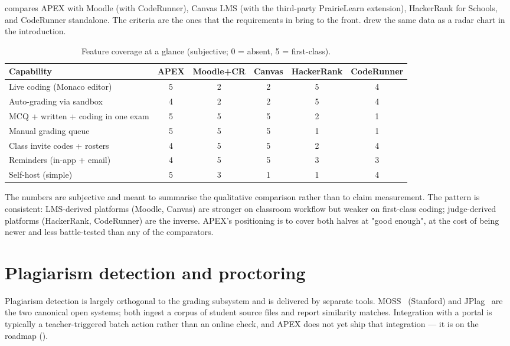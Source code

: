  compares APEX with Moodle (with CodeRunner), Canvas LMS (with the third-party PrairieLearn extension), HackerRank for Schools, and CodeRunner standalone. The criteria are the ones that the requirements in  bring to the front.  drew the same data as a radar chart in the introduction.

\begin{table}[H]
  \centering
  \caption{Feature coverage at a glance (subjective; 0 = absent, 5 = first-class).}
  \label{tab:peer-comparison}
  \small
  \begin{tabularx}{\linewidth}{X c c c c c}
    \toprule
    Capability & APEX & Moodle+CR & Canvas & HackerRank & CodeRunner \\
    \midrule
    Live coding (Monaco editor)               & 5 & 2 & 2 & 5 & 4 \\
    Auto-grading via sandbox                  & 4 & 2 & 2 & 5 & 4 \\
    MCQ + written + coding in one exam        & 5 & 5 & 5 & 2 & 1 \\
    Manual grading queue                       & 5 & 5 & 5 & 1 & 1 \\
    Class invite codes + rosters              & 4 & 5 & 5 & 2 & 4 \\
    Reminders (in-app + email)                 & 4 & 5 & 5 & 3 & 3 \\
    Self-host (simple)                         & 5 & 3 & 1 & 1 & 4 \\
    \bottomrule
  \end{tabularx}
\end{table}

The numbers are subjective and meant to summarise the qualitative comparison rather than to claim measurement. The pattern is consistent: LMS-derived platforms (Moodle, Canvas) are stronger on classroom workflow but weaker on first-class coding; judge-derived platforms (HackerRank, CodeRunner) are the inverse. APEX's positioning is to cover both halves at "good enough", at the cost of being newer and less battle-tested than any of the comparators.

\section{Plagiarism detection and proctoring}

Plagiarism detection is largely orthogonal to the grading subsystem and is delivered by separate tools. MOSS~\cite{moss} (Stanford) and JPlag~\cite{prechelt2002jplag} are the two canonical open systems; both ingest a corpus of student source files and report similarity matches. Integration with a portal is typically a teacher-triggered batch action rather than an online check, and APEX does not yet ship that integration --- it is on the roadmap ().


